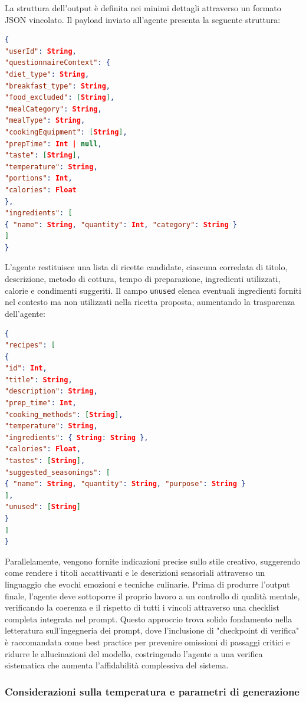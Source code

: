 La struttura dell'output è definita nei minimi dettagli attraverso un formato JSON vincolato. Il payload inviato all'agente presenta la seguente struttura:

\begin{lstlisting}[language=json]
{
"userId": String,
"questionnaireContext": {
"diet_type": String,
"breakfast_type": String,
"food_excluded": [String],
"mealCategory": String,
"mealType": String,
"cookingEquipment": [String],
"prepTime": Int | null,
"taste": [String],
"temperature": String,
"portions": Int,
"calories": Float
},
"ingredients": [
{ "name": String, "quantity": Int, "category": String }
]
}
\end{lstlisting}

L'agente restituisce una lista di ricette candidate, ciascuna corredata di titolo, descrizione, metodo di cottura, tempo di preparazione, ingredienti utilizzati, calorie e condimenti suggeriti. Il campo \texttt{unused} elenca eventuali ingredienti forniti nel contesto ma non utilizzati nella ricetta proposta, aumentando la trasparenza dell'agente:

\begin{lstlisting}[language=json]
{
"recipes": [
{
"id": Int,
"title": String,
"description": String,
"prep_time": Int,
"cooking_methods": [String],
"temperature": String,
"ingredients": { String: String },
"calories": Float,
"tastes": [String],
"suggested_seasonings": [
{ "name": String, "quantity": String, "purpose": String }
],
"unused": [String]
}
]
}
\end{lstlisting}

Parallelamente, vengono fornite indicazioni precise sullo stile creativo, suggerendo come rendere i titoli accattivanti e le descrizioni sensoriali attraverso un linguaggio che evochi emozioni e tecniche culinarie. Prima di produrre l'output finale, l'agente deve sottoporre il proprio lavoro a un controllo di qualità mentale, verificando la coerenza e il rispetto di tutti i vincoli attraverso una checklist completa integrata nel prompt. Questo approccio trova solido fondamento nella letteratura sull'ingegneria dei prompt, dove l'inclusione di "checkpoint di verifica" è raccomandata come best practice per prevenire omissioni di passaggi critici e ridurre le allucinazioni del modello, costringendo l'agente a una verifica sistematica che aumenta l'affidabilità complessiva del sistema.

\subsubsection{Considerazioni sulla temperatura e parametri di generazione}

